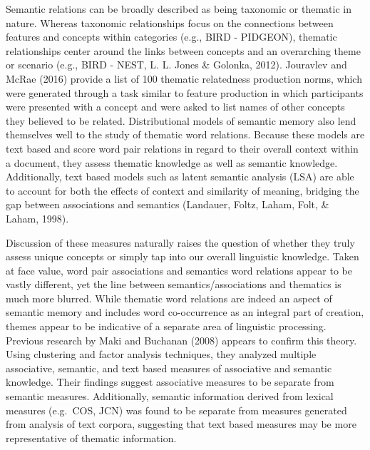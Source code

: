 \documentclass[english,man]{apa6}
\theoremstyle{definition}
\theoremstyle{definition}
\theoremstyle{definition}
\theoremstyle{remark}
\begin{document}
Semantic relations can be broadly described as being taxonomic or
thematic in nature. Whereas taxonomic relationships focus on the
connections between features and concepts within categories (e.g., BIRD
- PIDGEON), thematic relationships center around the links between
concepts and an overarching theme or scenario (e.g., BIRD - NEST, L. L.
Jones \& Golonka, 2012). Jouravlev and McRae (2016) provide a list of
100 thematic relatedness production norms, which were generated through
a task similar to feature production in which participants were
presented with a concept and were asked to list names of other concepts
they believed to be related. Distributional models of semantic memory
also lend themselves well to the study of thematic word relations.
Because these models are text based and score word pair relations in
regard to their overall context within a document, they assess thematic
knowledge as well as semantic knowledge. Additionally, text based models
such as latent semantic analysis (LSA) are able to account for both the
effects of context and similarity of meaning, bridging the gap between
associations and semantics (Landauer, Foltz, Laham, Folt, \& Laham,
1998).

Discussion of these measures naturally raises the question of whether
they truly assess unique concepts or simply tap into our overall
linguistic knowledge. Taken at face value, word pair associations and
semantics word relations appear to be vastly different, yet the line
between semantics/associations and thematics is much more blurred. While
thematic word relations are indeed an aspect of semantic memory and
includes word co-occurrence as an integral part of creation, themes
appear to be indicative of a separate area of linguistic processing.
Previous research by Maki and Buchanan (2008) appears to confirm this
theory. Using clustering and factor analysis techniques, they analyzed
multiple associative, semantic, and text based measures of associative
and semantic knowledge. Their findings suggest associative measures to
be separate from semantic measures. Additionally, semantic information
derived from lexical measures (e.g.~COS, JCN) was found to be separate
from measures generated from analysis of text corpora, suggesting that
text based measures may be more representative of thematic information.
\end{document}
